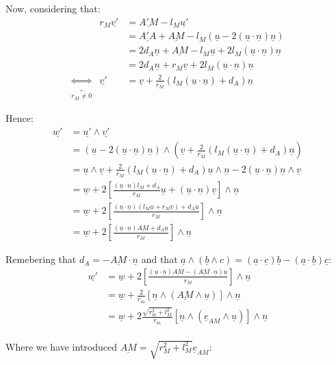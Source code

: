 \documentclass[a4paper,11pt,twoside,titlepage,openright]{book}
\numberwithin{equation}{section}
\newcommand{\ud}[1]{\underline{#1}}
\begin{document}
Now, considering that:
$$
\begin{array}{llll}
    & r_M\ud{v'}
    & = \ud{A'M}-l_M\ud{u'}\\
    && = \ud{A'A} + \ud{AM} - l_M(\ud{u} - 2(\ud{u}\cdot\ud{n})\ud{n})\\
    && = 2d_A\ud{n} + \ud{AM} - l_M\ud{u} + 2l_M(\ud{u}\cdot\ud{n})\ud{n}\\
    && = 2d_A\ud{n} + r_M\ud{v} + 2l_M(\ud{u}\cdot\ud{n})\ud{n}\\
    \underbrace{\Leftrightarrow}_{r_{M}\neq 0}
    & \ud{v'}
    & = \ud{v} + \frac{2}{r_M}\left(l_M(\ud{u}\cdot\ud{n}) + d_A\right)\ud{n}
\end{array}
$$

Hence:
$$
\begin{array}{lll}
    \ud{w'}
    & = \ud{u'} \wedge \ud{v'}\\
    & = (\ud{u} - 2(\ud{u}\cdot\ud{n})\ud{n})
    \wedge
    \left(\ud{v} + \frac{2}{r_M}\left(l_M(\ud{u}\cdot\ud{n}) + d_A\right)\ud{n}\right)\\
    & = \ud{u}\wedge\ud{v}
    + \frac{2}{r_M}\left(l_M(\ud{u}\cdot\ud{n}) + d_A\right)\ud{u}\wedge\ud{n}
    - 2(\ud{u}\cdot\ud{n})\ud{n}\wedge\ud{v}\\
    & = \ud{w}
    + 2\left[\frac{(\ud{u}\cdot\ud{n})l_M + d_A}{r_M}\ud{u}
    + (\ud{u}\cdot\ud{n})\ud{v}\right] \wedge \ud{n}\\
    & = \ud{w}
    + 2\left[\frac{(\ud{u}\cdot\ud{n})(l_M\ud{u}+r_M\ud{v}) + d_A\ud{u}}{r_M}
    \right] \wedge \ud{n}\\
    & = \ud{w}
    + 2\left[\frac{(\ud{u}\cdot\ud{n})\ud{AM} + d_A\ud{u}}{r_M}\right]
    \wedge \ud{n}
\end{array}
$$

Remebering that $d_A=-\ud{AM}\cdot\ud{n}$ and that
$\ud{a}\wedge(\ud{b}\wedge{c}) = (\ud{a}\cdot\ud{c})\ud{b} - (\ud{a}\cdot\ud{b})\ud{c}$:
$$
\begin{array}{lll}
    \ud{w'}
    & = \ud{w}
    + 2\left[\frac{(\ud{u}\cdot\ud{n})\ud{AM} - (\ud{AM}\cdot\ud{n})\ud{u}}{r_M}\right]
    \wedge \ud{n}\\
    & = \ud{w}
    + \frac{2}{r_m}\left[ \ud{n}\wedge (\ud{AM} \wedge \ud{u}) \right]
    \wedge \ud{n}\\
    & = \ud{w}
    + 2\frac{\sqrt{r_m^2+l_M^2}}{r_m}\left[ \ud{n}\wedge (\ud{e}_{AM} \wedge \ud{u}) \right]
    \wedge \ud{n}\\
\end{array}
$$

Where we have introduced $\ud{AM} = \sqrt{r_M^2+l_M^2} \ud{e}_{AM}$:
\end{document}
